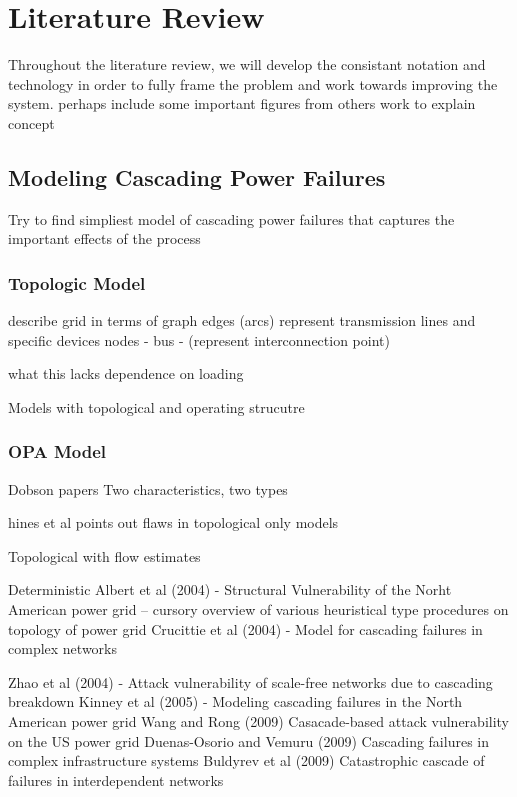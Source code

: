 

\section{Literature Review}


Throughout the literature review, we will develop the consistant notation and technology in order to fully frame the problem and work towards improving the system.
perhaps include some important figures from others work to explain concept

\subsection{Modeling Cascading Power Failures}

Try to find simpliest model of cascading power failures that captures the important effects of the process


\subsubsection{Topologic Model}

describe grid in terms of graph
edges (arcs) represent transmission lines and specific devices
nodes - bus - (represent interconnection point)

what this lacks dependence on loading


Models with topological and operating strucutre
\subsubsection{OPA Model}
Dobson papers
Two  characteristics, two types

hines et al  points out flaws in topological only models

Topological with flow estimates

Deterministic
Albert et al (2004) - Structural Vulnerability of the Norht American power grid 
-- cursory overview of various heuristical type procedures on topology of power grid
Crucittie et al (2004) - Model for cascading failures in complex networks

Zhao et al (2004) - Attack vulnerability of scale-free networks due to cascading breakdown
Kinney et al (2005) - Modeling cascading failures in the North American power grid
Wang and Rong (2009) Casacade-based attack vulnerability on the US power grid
Duenas-Osorio and Vemuru (2009) Cascading failures in complex infrastructure systems
Buldyrev et al (2009) Catastrophic cascade of failures in interdependent networks


